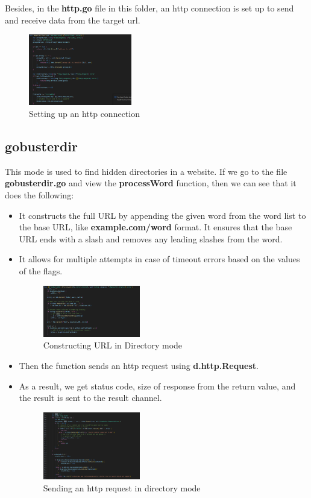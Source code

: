 \documentclass[12 pt]{article}
\begin{document}
Besides, in the \textbf{http.go} file in this folder, an http connection is set up to send and receive data from the target url.\\
\begin{figure}[H]
    \centering
    \includegraphics[width=0.4\textwidth]{HTTP_Connection.png}
    \caption{Setting up an http connection}
    \label{fig: HTTP Connection}
\end{figure}
\subsection{gobusterdir}
This mode is used to find hidden directories in a website. If we go to the file \textbf{gobusterdir.go} and view the \textbf{processWord} function, then we can see that it does the following:
\begin{itemize}
    \item It constructs the full URL by appending the given word from the word list to the base URL, like \textbf{example.com/word} format. It ensures that the base URL ends with a slash and removes any leading slashes from the word.
    \item It allows for multiple attempts in case of timeout errors based on the values of the flags.
    \begin{figure}[H]
        \centering
        \includegraphics[width=0.4\textwidth]{Gobusterdir_Constructing_Url.png}
        \caption{Constructing URL in Directory mode}
        \label{fig: Directory Mode Constructing URL}
    \end{figure}
    \item Then the function sends an http request using \textbf{d.http.Request}.
    \item As a result, we get status code, size of response from the return value, and the result is sent to the result channel.
    \begin{figure}[H]
        \centering
        \includegraphics[width=0.4\textwidth]{Gobusterdir_Http_Request.png}
        \caption{Sending an http request in directory mode}
        \label{fig: Directory Mode HTTP Request}
    \end{figure}
\end{itemize}
\end{document}
